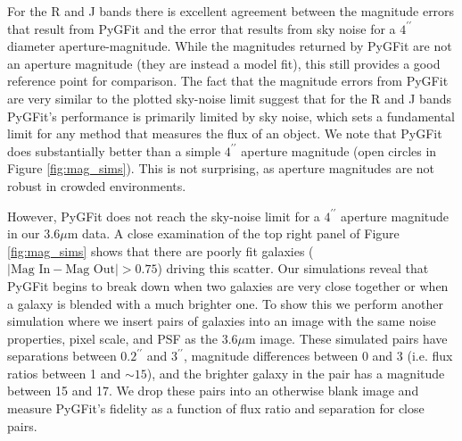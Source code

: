 \documentclass[apj]{emulateapj}
\newcommand{\sersic}{S\'{e}rsic}
\newcommand{\pygfit}{PyGFit}
\begin{document}
For the R and J bands there is excellent agreement between the magnitude errors that result from \pygfit{} and the error that results from sky noise for a $4^{\prime\prime}$ diameter aperture-magnitude.  While the magnitudes returned by \pygfit{} are not an aperture magnitude (they are instead a model fit), this still provides a good reference point for comparison.  The fact that the magnitude errors from \pygfit{} are very similar to the plotted sky-noise limit suggest that for the R and J bands \pygfit{}'s performance is primarily limited by sky noise, which sets a fundamental limit for any method that measures the flux of an object.  We note that \pygfit{} does substantially better than a simple $4^{\prime\prime}$ aperture magnitude (open circles in Figure \ref{fig:mag_sims}).  This is not surprising, as aperture magnitudes are not robust in crowded environments.

However, \pygfit{} does not reach the sky-noise limit for a $4^{\prime\prime}$ aperture magnitude in our $3.6\mu$m data.  A close examination of the top right panel of Figure \ref{fig:mag_sims} shows that there are poorly fit galaxies ($|\textrm{Mag In} - \textrm{Mag Out}| > 0.75$) driving this scatter.  Our simulations reveal that \pygfit{} begins to break down when two galaxies are very close together or when a galaxy is blended with a much brighter one.  To show this we perform another simulation where we insert pairs of galaxies into an image with the same noise properties, pixel scale, and PSF as the $3.6\mu$m image.  These simulated pairs have separations between $0.2^{\prime\prime}$ and $3^{\prime\prime}$, magnitude differences between 0 and 3 (i.e. flux ratios between 1 and $\sim15$), and the brighter galaxy in the pair has a magnitude between 15 and 17.  We drop these pairs into an otherwise blank image and measure \pygfit{}'s fidelity as a function of flux ratio and separation for close pairs.

\begin{figure*}
\caption{\pygfit{} errors as measured with our simulations for our $3.6\mu$m galaxies with $[3.6] < 19.0$ versus the number of objects in the blend (top left), the distance to the nearest blended object (top right), the flux ratio between the object and its nearest neighbor (bottom right), and the fraction of the blend flux accounted for by the simulated object (bottom left).}\label{fig:ch1_error_correlations}
\end{figure*}

\end{document}
